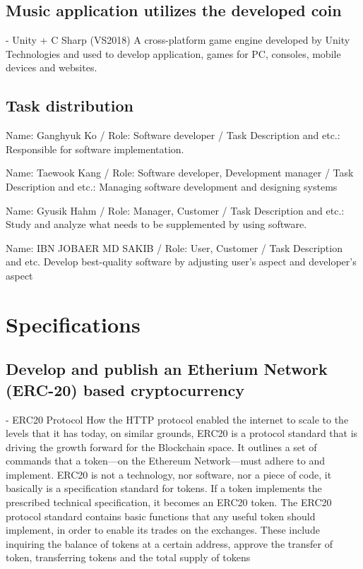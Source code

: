 \documentclass[conference]{IEEEtran}
\begin{document}
\subsection{Music application utilizes the developed coin}
- Unity + C Sharp (VS2018)
A cross-platform game engine developed by Unity Technologies and used to develop application, games for PC, consoles, mobile devices and websites.

\subsection{Task distribution}
Name: 	Ganghyuk Ko /
Role: 	Software developer /
Task Description and etc.: 
Responsible for software implementation.

Name: 	Taewook Kang /
Role: 	Software developer, Development manager /
Task Description and etc.:
Managing software development and designing systems

Name: 	Gyusik Hahm /
Role: 	Manager, Customer /
Task Description and etc.:
Study and analyze what needs to be supplemented by using software.

Name: 	IBN JOBAER MD SAKIB /
Role: 	User, Customer /
Task Description and etc.
Develop best-quality software by adjusting user’s aspect and developer’s aspect

\section{Specifications}

\subsection{Develop and publish an Etherium Network (ERC-20) based cryptocurrency}
- ERC20 Protocol
How the HTTP protocol enabled the internet to scale to the levels that it has today, on similar grounds, ERC20 is a protocol standard that is driving the growth forward for the Blockchain space.
It outlines a set of commands that a token—on the Ethereum Network—must adhere to and implement. ERC20 is not a technology, nor software, nor a piece of code, it basically is a specification standard for tokens. If a token implements the prescribed technical specification, it becomes an ERC20 token.
The ERC20 protocol standard contains basic functions that any useful token should implement, in order to enable its trades on the exchanges. These include inquiring the balance of tokens at a certain address, approve the transfer of token, transferring tokens and the total supply of tokens
\end{document}
